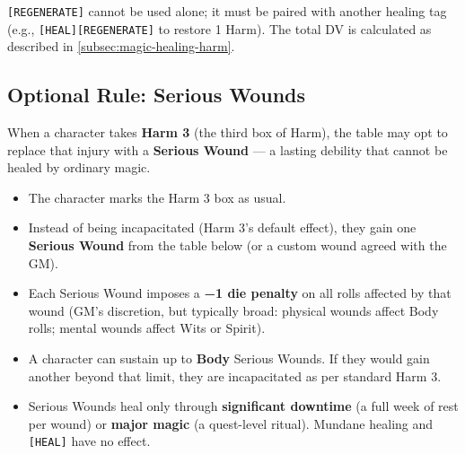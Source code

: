 \texttt{[REGENERATE]} cannot be used alone; it must be paired with another healing tag (e.g., \texttt{[HEAL][REGENERATE]} to restore 1 Harm). The total DV is calculated as described in \ref{subsec:magic-healing-harm}.

\subsection{Optional Rule: Serious Wounds}
\label{subsec:serious-wounds}
When a character takes \textbf{Harm 3} (the third box of Harm), the table may opt to replace that injury with a \textbf{Serious Wound} --- a lasting debility that cannot be healed by ordinary magic.

\begin{itemize}
  \item The character marks the Harm 3 box as usual.
  \item Instead of being incapacitated (Harm 3's default effect), they gain one \textbf{Serious Wound} from the table below (or a custom wound agreed with the GM).
  \item Each Serious Wound imposes a \textbf{−1 die penalty} on all rolls affected by that wound (GM's discretion, but typically broad: physical wounds affect Body rolls; mental wounds affect Wits or Spirit).
  \item A character can sustain up to \textbf{Body} Serious Wounds. If they would gain another beyond that limit, they are incapacitated as per standard Harm 3.
  \item Serious Wounds heal only through \textbf{significant downtime} (a full week of rest per wound) or \textbf{major magic} (a quest-level ritual). Mundane healing and \texttt{[HEAL]} have no effect.
\end{itemize}

